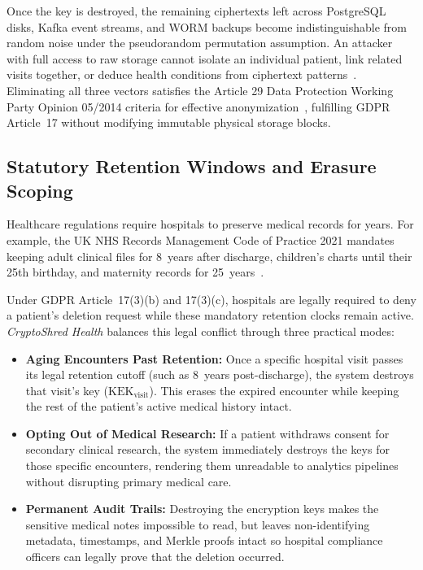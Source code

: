 Once the key is destroyed, the remaining ciphertexts left across PostgreSQL disks, Kafka event streams, and WORM backups become indistinguishable from random noise under the pseudorandom permutation assumption. An attacker with full access to raw storage cannot isolate an individual patient, link related visits together, or deduce health conditions from ciphertext patterns~\cite{garfinkel2007}. Eliminating all three vectors satisfies the Article 29 Data Protection Working Party Opinion 05/2014 criteria for effective anonymization~\cite{edpb2014}, fulfilling GDPR Article~17 without modifying immutable physical storage blocks.

\subsection{Statutory Retention Windows and Erasure Scoping}

Healthcare regulations require hospitals to preserve medical records for years. For example, the UK NHS Records Management Code of Practice 2021 mandates keeping adult clinical files for 8~years after discharge, children's charts until their 25th birthday, and maternity records for 25~years~\cite{nhs_records_2021}.

Under GDPR Article~17(3)(b) and 17(3)(c), hospitals are legally required to deny a patient's deletion request while these mandatory retention clocks remain active. \textit{CryptoShred Health} balances this legal conflict through three practical modes:
\begin{itemize}
    \item \textbf{Aging Encounters Past Retention:} Once a specific hospital visit passes its legal retention cutoff (such as 8~years post-discharge), the system destroys that visit's key ($\text{KEK}_{\text{visit}}$). This erases the expired encounter while keeping the rest of the patient's active medical history intact.
    \item \textbf{Opting Out of Medical Research:} If a patient withdraws consent for secondary clinical research, the system immediately destroys the keys for those specific encounters, rendering them unreadable to analytics pipelines without disrupting primary medical care.
    \item \textbf{Permanent Audit Trails:} Destroying the encryption keys makes the sensitive medical notes impossible to read, but leaves non-identifying metadata, timestamps, and Merkle proofs intact so hospital compliance officers can legally prove that the deletion occurred.
\end{itemize}


